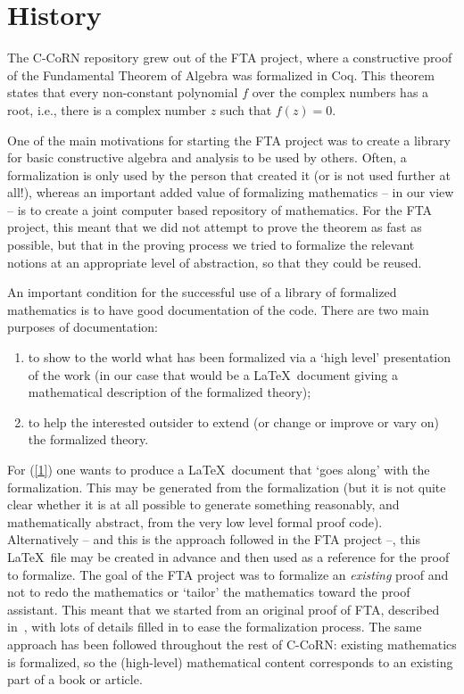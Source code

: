 \documentclass[runningheads]{llncs}
\newcommand{\ccorn}{\mbox{C-CoRN}}
\newcommand{\fta}{FTA}
\begin{document}
\section{History\label{history}}          
The {\ccorn} repository grew out of the {\fta} project,
where a constructive proof of the Fundamental Theorem of Algebra was
formalized in Coq.  This theorem states that every non-constant
polynomial $f$ over the complex numbers has a root, i.e., there is a
complex number $z$ such that $f(z) = 0$.

One of the main motivations for starting the
{\fta} project was to create a library for basic constructive algebra and
analysis to be used by others. Often, a formalization is only used by
the person that created it (or is not used further at all!), whereas
an important added value of formalizing mathematics -- in our view --
is to create a joint computer based repository of mathematics. For the
{\fta} project, this meant that we did not attempt to prove the theorem
as fast as possible, but that in the proving process we tried to
formalize the relevant notions at an appropriate level of abstraction,
so that they could be reused.

An important condition for the successful use of a library of
formalized mathematics is to have good documentation of the code.
There are two main purposes of documentation:
\begin{enumerate}
\item\label{1}
to show to the world
what has been formalized via a `high level' presentation of the work
(in our case that would be a \LaTeX\ document giving a mathematical
description of the formalized theory);
\item\label{2}
to help the interested
outsider to extend (or change or improve or vary on) the formalized
theory.
\end{enumerate}

For (\ref{1}) one wants to produce a \LaTeX\ document that `goes
along' with the formalization. This may be generated from the
formalization (but it is not quite clear whether it is at all possible
to generate something reasonably, and mathematically abstract, from the
very low level formal proof code).  Alternatively -- and this is the
approach followed in the {\fta} project --, this \LaTeX\ file may be
created in advance and then used as a reference for the proof to
formalize.  The goal of the {\fta} project was to formalize an {\em
existing\/} proof and not to redo the mathematics or `tailor' the
mathematics toward the proof assistant. This meant that we started
from an original proof of {\fta}, described in~\cite{geuvers2001},
with lots of details filled in to ease the formalization process.  The
same approach has been followed throughout the rest of {\ccorn}:
existing mathematics is formalized, so the (high-level) mathematical
content corresponds to an existing part of a book or article.
\end{document}
